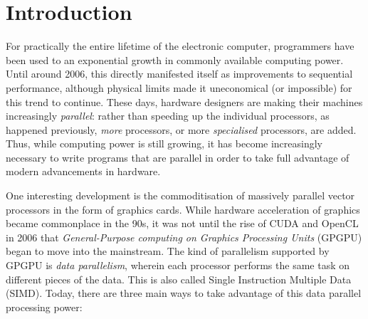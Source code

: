 \chapter{Introduction}

For practically the entire lifetime of the electronic computer,
programmers have been used to an exponential growth in commonly
available computing power.  Until around 2006, this directly
manifested itself as improvements to sequential performance, although
physical limits made it uneconomical (or impossible) for this trend to
continue.  These days, hardware designers are making their machines
increasingly \textit{parallel}: rather than speeding up the individual
processors, as happened previously, \textit{more} processors, or more
\textit{specialised} processors, are added.  Thus, while computing
power is still growing, it has become increasingly necessary to write
programs that are parallel in order to take full advantage of modern
advancements in hardware.

One interesting development is the commoditisation of massively
parallel vector processors in the form of graphics cards.  While
hardware acceleration of graphics became commonplace in the 90s, it
was not until the rise of CUDA and OpenCL in 2006 that
\textit{General-Purpose computing on Graphics Processing Units}
(GPGPU) began to move into the mainstream.  The kind of parallelism
supported by GPGPU is \textit{data parallelism}, wherein each
processor performs the same task on different pieces of the data.
This is also called Single Instruction Multiple Data (SIMD).  Today,
there are three main ways to take advantage of this data parallel
processing power:

